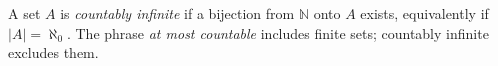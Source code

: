 
A set $A$ is \emph{countably infinite} if a bijection from $\mathbb N$ onto $A$ exists, equivalently if $|A|=\aleph_0$. The phrase \emph{at most countable} includes finite sets; countably infinite excludes them.
